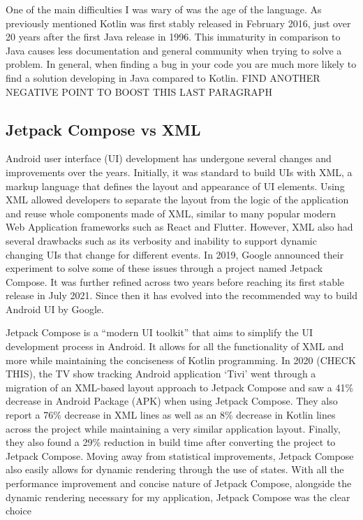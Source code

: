 \documentclass{l4proj}
\begin{document}
One of the main difficulties I was wary of was the age of the language. As previously mentioned Kotlin was first stably released in February 2016, just over 20 years after the first Java release in 1996. This immaturity in comparison to Java causes less documentation and general community when trying to solve a problem. In general, when finding a bug in your code you are much more likely to find a solution developing in Java compared to Kotlin. FIND ANOTHER NEGATIVE POINT TO BOOST THIS LAST PARAGRAPH

\subsection{Jetpack Compose vs XML}
\label{sec:composevsxml}

Android user interface (UI) development has undergone several changes and improvements over the years. Initially, it was standard to build UIs with XML, a markup language that defines the layout and appearance of UI elements. Using XML allowed developers to separate the layout from the logic of the application and reuse whole components made of XML, similar to many popular modern Web Application frameworks such as React and Flutter. However, XML also had several drawbacks such as its verbosity and inability to support dynamic changing UIs that change for different events. In 2019, Google announced their experiment to solve some of these issues through a project named Jetpack Compose.  It was further refined across two years before reaching its first stable release in July 2021. Since then it has evolved into the recommended way to build Android UI by Google.

Jetpack Compose is a “modern UI toolkit” that aims to simplify the UI development process in Android. It allows for all the functionality of XML and more while maintaining the conciseness of Kotlin programming. In 2020 (CHECK THIS), the TV show tracking Android application ‘Tivi’ went through a migration of an XML-based layout approach to Jetpack Compose and saw a 41\% decrease in Android Package (APK) when using Jetpack Compose. They also report a 76\% decrease in XML lines as well as an 8\% decrease in Kotlin lines across the project while maintaining a very similar application layout. Finally, they also found a 29\% reduction in build time after converting the project to Jetpack Compose. Moving away from statistical improvements, Jetpack Compose also easily allows for dynamic rendering through the use of states. With all the performance improvement and concise nature of Jetpack Compose, alongside the dynamic rendering necessary for my application, Jetpack Compose was the clear choice
\end{document}
